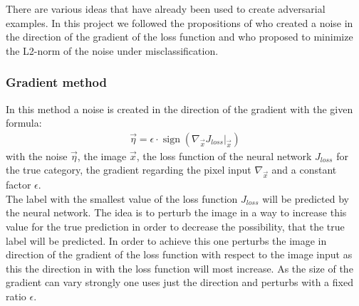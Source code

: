 \documentclass[%
 reprint,
 amsmath,amssymb,
 aps,
]{revtex4-1}
\begin{document}
There are various ideas that have already been used to create adversarial examples. In this project we followed the propositions of \citeauthor{paperGrad} who created a noise in the direction of the gradient of the loss function and \citeauthor{paperMinimize} who proposed to minimize the L2-norm of the noise under misclassification.
\subsubsection*{Gradient method}
In this method a noise is created in the direction of the gradient with the given formula:
\begin{align*}
\vec{\eta} = \epsilon \cdot \operatorname{sign} \left( \nabla_{\vec{x}} J_{loss} \big \vert_{\vec{x}} \right)
\end{align*}
with the noise $\vec{\eta}$, the image $\vec{x}$, the loss function of the neural network $J_{loss}$ for the true category, the gradient regarding the pixel input $\nabla_{\vec{x}}$ and a constant factor $\epsilon$.\\
The label with the smallest value of the loss function $J_{loss}$ will be predicted by the neural network. The idea is to perturb the image in a way to increase this value for the true prediction in order to decrease the possibility, that the true label will be predicted. In order to achieve this one perturbs the image in direction of the gradient of the loss function with respect to the image input as this the direction in with the loss function will most increase. As the size of the gradient can vary strongly one uses just the direction and perturbs with a fixed ratio $\epsilon$. \cite{paperGrad}
\end{document}
